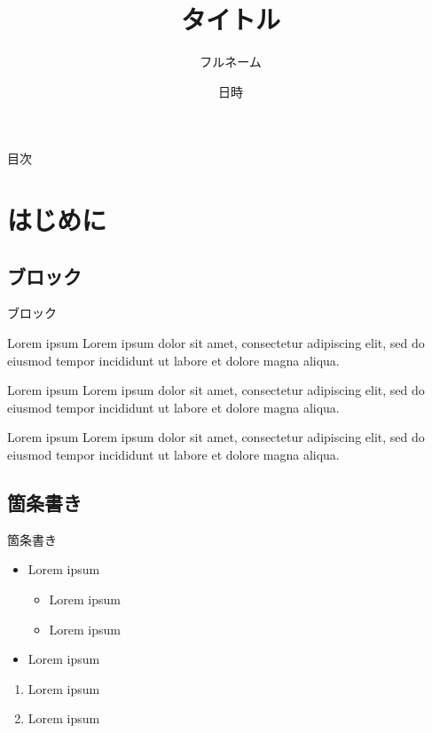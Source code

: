 \documentclass[unicode]{beamer}
\title{タイトル}
\author[名字とか]{フルネーム}
\date{日時}
\begin{document}
  {\maketitle}


  \begin{frame}{目次}
    \tableofcontents
  \end{frame}

  \section{はじめに}
  \subsection{ブロック}
  \begin{frame}{ブロック}
    \begin{block}{Lorem ipsum}
      Lorem ipsum dolor sit amet, consectetur adipiscing elit, sed do eiusmod tempor incididunt ut labore et dolore magna aliqua.
    \end{block}

    \begin{alertblock}{Lorem ipsum}
      Lorem ipsum dolor sit amet, consectetur adipiscing elit, sed do eiusmod tempor incididunt ut labore et dolore magna aliqua.
    \end{alertblock}

    \begin{exampleblock}{Lorem ipsum}
      Lorem ipsum dolor sit amet, consectetur adipiscing elit, sed do eiusmod tempor incididunt ut labore et dolore magna aliqua.
    \end{exampleblock}
  \end{frame}

  \subsection{箇条書き}
  \begin{frame}{箇条書き}
    \begin{itemize}
      \item Lorem ipsum
      \begin{itemize}
        \item Lorem ipsum
        \item Lorem ipsum
      \end{itemize}
      \item Lorem ipsum
    \end{itemize}

    \begin{enumerate}
      \item Lorem ipsum
      \item Lorem ipsum
    \end{enumerate}
  \end{frame}
\end{document}
